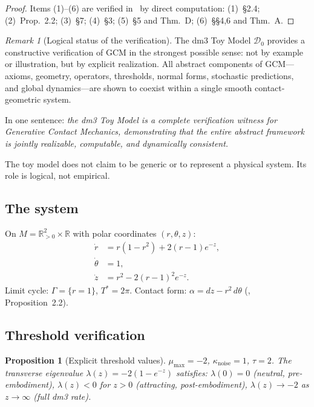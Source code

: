 \documentclass[12pt, oneside]{book}
\theoremstyle{plain}
\newtheorem{proposition}[theorem]{Proposition}
\theoremstyle{definition}
\theoremstyle{remark}
\newtheorem{remark}{Remark}[section]
\newcommand{\R}{\mathbb{R}}
\newcommand{\Orb}{\Gamma}
\begin{document}
\begin{proof}
Items (1)--(6) are verified in~\cite{Paper2} by direct computation:
(1)~\S2.4; (2)~Prop.~2.2; (3)~\S7; (4)~\S3; (5)~\S5 and Thm.~D;
(6)~\S\S4,6 and Thm.~A.
\end{proof}

\begin{remark}[Logical status of the verification]
The dm3 Toy Model $\mathcal{D}_0$ provides a constructive
verification of GCM in the strongest possible sense: not by
example or illustration, but by explicit realization. All abstract
components of GCM---axioms, geometry, operators, thresholds,
normal forms, stochastic predictions, and global dynamics---are
shown to coexist within a single smooth contact-geometric system.

In one sentence: \emph{the dm3 Toy Model is a complete verification
witness for Generative Contact Mechanics, demonstrating that the
entire abstract framework is jointly realizable, computable, and
dynamically consistent.}

The toy model does not claim to be generic or to represent a
physical system. Its role is logical, not empirical.
\end{remark}

\subsection{The system}
\label{subsec:system}

On $M=\R^2_{>0}\times\R$ with polar coordinates $(r,\theta,z)$:
\begin{align}
  \dot r &= r(1-r^2)+2(r-1)e^{-z},\label{eq:rdot}\\
  \dot\theta &= 1,\label{eq:tdot}\\
  \dot z &= r^2 - 2(r-1)^2 e^{-z}.\label{eq:zdot}
\end{align}
Limit cycle: $\Orb=\{r=1\}$, $T^*=2\pi$.
Contact form: $\alpha=dz-r^2\,d\theta$
(\cite{Paper2}, Proposition~2.2).

\subsection{Threshold verification}

\begin{proposition}[Explicit threshold values]
\label{prop:explicit}
$\mu_{\max}=-2$, $\kappa_{\mathrm{noise}}=1$, $\tau=2$.
The transverse eigenvalue $\lambda(z)=-2(1-e^{-z})$ satisfies:
$\lambda(0)=0$ (neutral, pre-embodiment),
$\lambda(z)<0$ for $z>0$ (attracting, post-embodiment),
$\lambda(z)\to -2$ as $z\to\infty$ (full dm3 rate).
\end{proposition}
\end{document}
